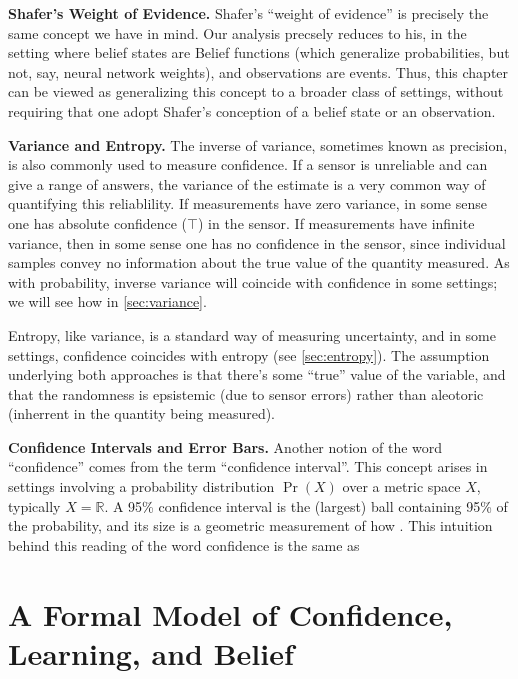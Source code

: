 {	\textbf{Shafer's Weight of Evidence.}
	Shafer's ``weight of evidence'' is precisely the same concept we have in mind.
	Our analysis precsely reduces to his, in the setting where belief states are Belief functions (which generalize probabilities, but not, say, neural network weights), and observations are events.
	Thus, this chapter can be viewed as generalizing this concept to a broader class of settings, without requiring that one adopt Shafer's conception of a belief state or an observation.


	\textbf{Variance and Entropy.}
	The inverse of variance, sometimes known as precision,
		is also commonly used to measure confidence.
	If a sensor is unreliable and can give a range of answers, the variance of the estimate is a very common way of quantifying this reliablility.
	If measurements have zero variance, in some sense one has absolute confidence ($\top$) in the sensor. If measurements have infinite variance, then in some sense one has no confidence in the sensor, since individual samples convey no information about the true value of the quantity measured.
	As with probability, inverse variance will coincide with confidence in some settings; we will see how in \cref{sec:variance}.

	Entropy, like variance, is a standard way of measuring uncertainty, and in some settings, confidence coincides with entropy (see \cref{sec:entropy}).
	The assumption underlying both approaches is that there's some ``true'' value of the variable, and that the randomness is epsistemic (due to sensor errors) rather than aleotoric (inherrent in the quantity being measured).

	\textbf{Confidence Intervals and Error Bars.}
	Another notion of the word ``confidence'' comes from the term ``confidence interval''.
	This concept arises in settings involving a probability distribution $\Pr(X)$ over a metric space $X$, typically $X = \mathbb R$.
	A 95\% confidence interval is the (largest) ball containing 95\% of the probability, and its size is a geometric measurement of how .
	This intuition behind this reading of the word confidence is the same as
}






\section{A Formal Model of Confidence, Learning, and Belief}

